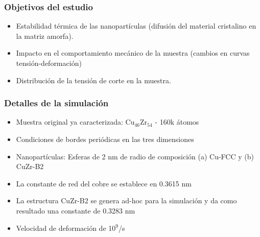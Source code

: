 \begin{frame}
\frametitle{Objetivos del estudio}
\vspace{0.5cm}
 \begin{itemize}
  \item Estabilidad t\'ermica de las nanopart\'iculas (difusi\'on del material cristalino en la matriz amorfa).
  \item Impacto en el comportamiento mec\'anico de la muestra (cambios en curvas tensi\'on-deformaci\'on)
  \item Distribuci\'on de la tensi\'on de corte en la muestra.
 \end{itemize}
\end{frame}

\begin{frame}
 \frametitle{Detalles de la simulaci\'on}
 \vspace{0.5cm}
 \begin{itemize}
  \item Muestra original ya caracterizada: Cu$_{46}$Zr$_{54}$ - 160k \'atomos
  \item Condiciones de bordes peri\'odicas en las tres dimensiones
  \item Nanopart\'iculas: Esferas de 2 nm de radio de composici\'on (a) Cu-FCC y (b) CuZr-B2
  \item La constante de red del cobre se establece en 0.3615 nm
  \item La estructura CuZr-B2 se genera ad-hoc para la simulaci\'on y da como resultado una constante de 0.3283 nm
  \item Velocidad de deformaci\'on de 10$^{9}$/s
 \end{itemize}
\end{frame}

